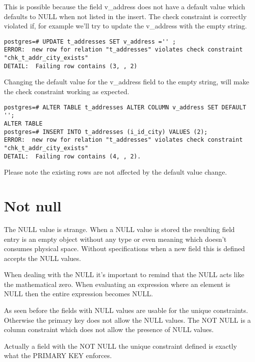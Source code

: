 This is possible because the field v\_address does not have a default value which defaults to NULL when
not listed in the insert. The check constraint is correctly violated if, for example we'll try to update
the v\_address with the empty string.

\begin{lstlisting}[style=pgsql]
postgres=# UPDATE t_addresses SET v_address ='' ;
ERROR:  new row for relation "t_addresses" violates check constraint "chk_t_addr_city_exists"
DETAIL:  Failing row contains (3, , 2)
\end{lstlisting}

Changing the default value for the v\_address field to the empty string, will make the check constraint
working as expected.

\begin{lstlisting}[style=pgsql]
postgres=# ALTER TABLE t_addresses ALTER COLUMN v_address SET DEFAULT '';
ALTER TABLE
postgres=# INSERT INTO t_addresses (i_id_city) VALUES (2);
ERROR:  new row for relation "t_addresses" violates check constraint "chk_t_addr_city_exists"
DETAIL:  Failing row contains (4, , 2).

\end{lstlisting}
Please note the existing rows are not affected by the default value change.


\section{Not null}
The NULL value is strange. When a NULL value is stored the resulting field entry is an empty object
without any type or even meaning which doesn't consumes physical space. Without specifications when a
new field this is defined accepts the NULL values.\newline

When dealing with the NULL it's important to remind that the NULL acts like the mathematical
zero. When evaluating an expression where an element is NULL then the entire expression becomes
NULL.\newline

As seen before the fields with NULL values are usable for the unique constraints. Otherwise the primary
key does not allow the NULL values. The NOT NULL is a column constraint which does not allow the presence
of NULL values.\newline

Actually a field with the NOT NULL the unique constraint defined is exactly what the PRIMARY KEY
enforces.\newline

